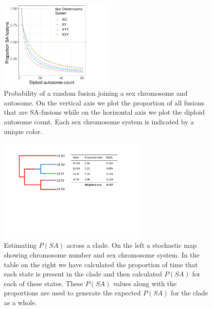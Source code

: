 \documentclass[12pt]{article}
\begin{document}
\begin{figure}
\includegraphics[width=0.5\textwidth]{autosome.num.pdf}
\caption{Probability of a random fusion joining a sex chromosome and autosome. On the vertical axis we plot the proportion of all fusions that are SA-fusions while on the horizontal axis we plot the diploid autosome count. Each sex chromosome system is indicated by a unique color.}
\label{autosomenum}
\end{figure}


\begin{figure} 
\includegraphics[width=0.65\textwidth]{approach.pdf}
\caption{Estimating $P(SA)$ across a clade. On the left a stochastic map showing chromosome number and sex chromosome system. In the table on the right we have calculated the proportion of time that each state is present in the clade and then calculated $P(SA)$ for each of these states. These $P(SA)$ values along with the proportions are used to generate the expected $P(SA)$ for the clade as a whole.}
\label{approach}
\end{figure}




\clearpage


\end{document}
